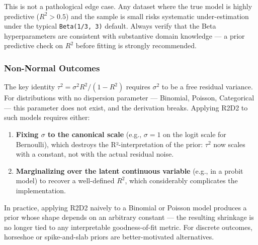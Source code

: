 \documentclass[
  letterpaper,
  DIV=11,
  numbers=noendperiod]{scrartcl}
\begin{document}
\begin{tcolorbox}[enhanced jigsaw, titlerule=0mm, arc=.35mm, leftrule=.75mm, colback=white, bottomtitle=1mm, toptitle=1mm, colbacktitle=quarto-callout-warning-color!10!white, colframe=quarto-callout-warning-color-frame, opacitybacktitle=0.6, bottomrule=.15mm, opacityback=0, toprule=.15mm, left=2mm, title=\textcolor{quarto-callout-warning-color}{\faExclamationTriangle}\hspace{0.5em}{Warning}, rightrule=.15mm, breakable, coltitle=black]

This is not a pathological edge case. Any dataset where the true model
is highly predictive (\(R^2 > 0.5\)) and the sample is small risks
systematic under-estimation under the typical \texttt{Beta(1/3,\ 3)}
default. Always verify that the Beta hyperparameters are consistent with
substantive domain knowledge --- a prior predictive check on \(R^2\)
before fitting is strongly recommended.

\end{tcolorbox}

\subsubsection{Non-Normal Outcomes}\label{non-normal-outcomes}

The key identity \(\tau^2 = \sigma^2 R^2 / (1 - R^2)\) requires
\(\sigma^2\) to be a free residual variance. For distributions with no
dispersion parameter --- Binomial, Poisson, Categorical --- this
parameter does not exist, and the derivation breaks. Applying R2D2 to
such models requires either:

\begin{enumerate}
\def\labelenumi{\arabic{enumi}.}
\item
  \textbf{Fixing \(\sigma\) to the canonical scale} (e.g.,
  \(\sigma = 1\) on the logit scale for Bernoulli), which destroys the
  R²-interpretation of the prior: \(\tau^2\) now scales with a constant,
  not with the actual residual noise.
\item
  \textbf{Marginalizing over the latent continuous variable} (e.g., in a
  probit model) to recover a well-defined \(R^2\), which considerably
  complicates the implementation.
\end{enumerate}

In practice, applying R2D2 naively to a Binomial or Poisson model
produces a prior whose shape depends on an arbitrary constant --- the
resulting shrinkage is no longer tied to any interpretable
goodness-of-fit metric. For discrete outcomes, horseshoe or
spike-and-slab priors are better-motivated alternatives.
\end{document}
